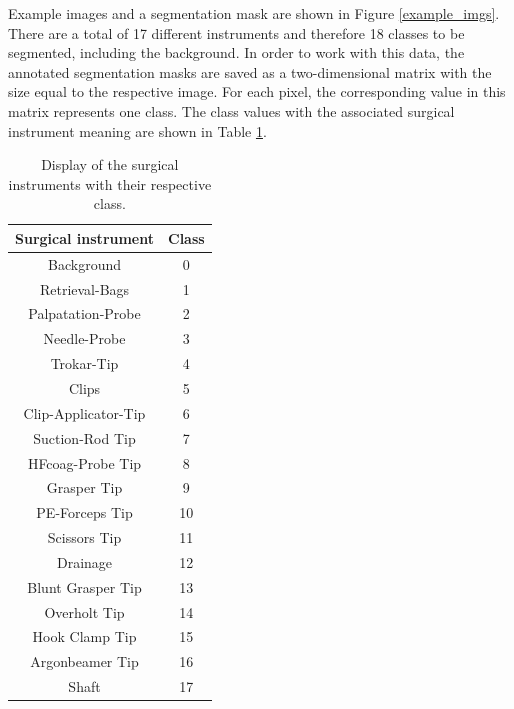 Example images and a segmentation mask are shown in Figure \ref{example_imgs}.
There are a total of 17 different instruments and therefore 18 classes to be segmented, including the background.
In order to work with this data, the annotated segmentation masks are saved as a two-dimensional matrix with the size equal to the respective image.
For each pixel, the corresponding value in this matrix represents one class.
The class values with the associated surgical instrument meaning are shown in Table \ref{surg_inst}.
\begin{table}[!tb]\vspace{1ex}\centering
    \caption[Surgical instruments]{Display of the surgical instruments with their respective class.
    \label{surg_inst}}
    \begin{tabular*}{6cm}{cc}
    Surgical instrument & Class\\\hline
     Background & 0\\
     Retrieval-Bags & 1\\
     Palpatation-Probe & 2\\
     Needle-Probe & 3\\
     Trokar-Tip & 4\\
     Clips & 5\\
     Clip-Applicator-Tip&6\\
     Suction-Rod Tip& 7 \\
     HFcoag-Probe Tip& 8 \\
     Grasper Tip& 9 \\
     PE-Forceps Tip& 10\\ 
     Scissors Tip& 11 \\
     Drainage& 12 \\
     Blunt Grasper Tip& 13\\ 
     Overholt Tip& 14 \\
     Hook Clamp Tip& 15 \\
     Argonbeamer Tip& 16 \\
     Shaft& 17\\\hline
    \end{tabular*}
\vspace{2ex}\end{table}
